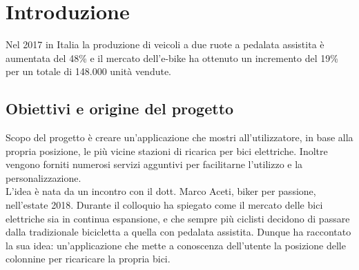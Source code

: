 
%

\section{Introduzione}
	Nel 2017 in Italia la produzione di veicoli a due ruote a pedalata assistita è aumentata
	del 48\% e il mercato dell'e-bike ha ottenuto un incremento del 
	19\%  per un totale di 148.000 unità vendute.
	\cite{biciElettrica}   
	\subsection{Obiettivi e origine del progetto}
	Scopo del progetto è creare un’applicazione che mostri all’utilizzatore, in
	base  alla propria posizione, le più vicine stazioni di ricarica per bici
	elettriche. Inoltre vengono forniti numerosi servizi agguntivi per
	facilitarne l'utilizzo e la personalizzazione.\\
	L'idea è nata da un incontro con il dott. Marco Aceti, biker per passione,
	nell'estate 2018. Durante il colloquio ha spiegato come il mercato delle
	bici elettriche sia in continua espansione, e che sempre più ciclisti
	decidono di passare dalla tradizionale bicicletta a quella con pedalata
	assistita. Dunque ha raccontato la sua idea: un'applicazione che mette a
	conoscenza dell'utente la posizione delle colonnine per ricaricare la
	propria bici.
	
